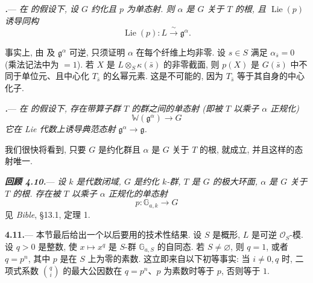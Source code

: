 \par\medskip\noindent
{}\textbf{\textit{.}}---
\textit{在  的假设下, 设 \(G\) 约化且 \(p\) 为单态射. 则 \(\alpha\) 是 \(G\) 关于 \(T\) 的根, 且 \(\operatorname{Lie}(p)\) 诱导同构}
\[
  \operatorname{Lie}(p)\colon
  L\xrightarrow{\ \sim\ }\mathfrak g^\alpha.
\]

事实上, 由  及 \(\mathfrak g^\alpha\) 可逆, 只须证明 \(\alpha\) 在每个纤维上均非零. 设 \(s\in S\) 满足 \(\alpha_{\bar s}=0\) \textup{(乘法记法中为 \(=1\))}. 若 \(X\) 是 \(L\otimes_S\kappa(\bar s)\) 的非零截面, 则 \(p(X)\) 是 \(G(\bar s)\) 中不同于单位元、且中心化 \(T_{\bar s}\) 的幺幂元素. 这是不可能的, 因为 \(T_{\bar s}\) 等于其自身的中心化子.

\par\medskip\noindent
{}\textbf{\textit{.}}---
\textit{在  的假设下, 存在带算子群 \(T\) 的群之间的单态射 \textup{(即被 \(T\) 以乘子 \(\alpha\) 正规化)}
\[
  \mathbb W(\mathfrak g^\alpha)\longrightarrow G
\]
它在 Lie 代数上诱导典范态射 \(\mathfrak g^\alpha\to\mathfrak g\).}

我们很快将看到, 只要 \(G\) 是约化群且 \(\alpha\) 是 \(G\) 关于 \(T\) 的根,  就成立, 并且这样的态射唯一.

\par\medskip\noindent
\textbf{\textit{回顾 4.10.}}---
\textit{设 \(k\) 是代数闭域, \(G\) 是约化 \(k\)-群, \(T\) 是 \(G\) 的极大环面, \(\alpha\) 是 \(G\) 关于 \(T\) 的根. 存在被 \(T\) 以乘子 \(\alpha\) 正规化的单态射}
\[
  p\colon\mathbb G_{a,k}\longrightarrow G
\]
见 \emph{Bible}, §13.1, 定理 1.

\par\medskip\noindent
\textbf{4.11.}---
本节最后给出一个以后要用的技术性结果. 设 \(S\) 是概形, \(L\) 是可逆 \(\mathcal O_S\)-模. 设 \(q>0\) 是整数, 使 \(x\longmapsto x^q\) 是 \(S\)-群 \(\mathbb G_{a,S}\) 的自同态. 若 \(S\ne\varnothing\), 则 \(q=1\), 或者 \(q=p^n\), 其中 \(p\) 是在 \(S\) 上为零的素数. 这立即来自以下初等事实: 当 \(i\ne0,q\) 时, 二项式系数 \(\binom qi\) 的最大公因数在 \(q=p^n\)、\(p\) 为素数时等于 \(p\), 否则等于 \(1\).

